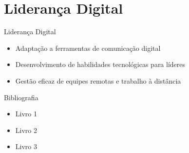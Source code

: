 \documentclass[aspectratio=169,xcolor=dvipsnames]{beamer}
\begin{document}
\section{Liderança Digital}

\begin{frame}{Liderança Digital}
	\begin{itemize}
		\item Adaptação a ferramentas de comunicação digital
		\item Desenvolvimento de habilidades tecnológicas para líderes
		\item Gestão eficaz de equipes remotas e trabalho à distância

	\end{itemize}
\end{frame}

\begin{frame}{Bibliografia}
	\begin{itemize}
		\item Livro 1
		\item Livro 2
		\item Livro 3

	\end{itemize}
\end{frame}
\end{document}
